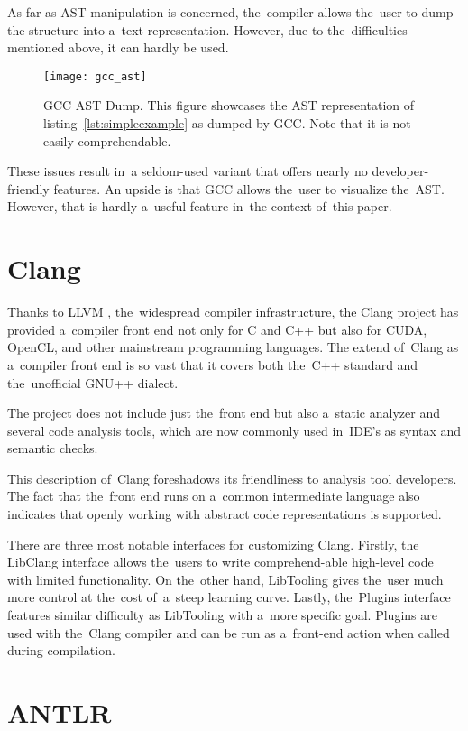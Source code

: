 As far as AST manipulation is concerned, the~compiler allows the~user to dump 
the structure into a~text representation. 
However, due to the~difficulties mentioned above, it can hardly be used.

\begin{figure}[p]\centering
\texttt{[image: gcc\_ast]}
\caption{GCC AST Dump. This figure showcases 
the AST representation of listing~\ref{lst:simpleexample}
as dumped by GCC. Note that it is not easily comprehendable.}
\label{img:gcc}
\end{figure}

These issues result in~a seldom-used variant that offers nearly 
no developer-friendly features. 
An upside is that GCC allows the~user to visualize the~AST. 
However, that is hardly a~useful feature in~the context of~this paper.

\section{Clang}

Thanks to LLVM \citep{llvm:online}, the~widespread compiler infrastructure,
the Clang project \citep{clang:online}
has provided a~compiler front end not only for C and C++ but also 
for CUDA, OpenCL, and other mainstream programming languages. 
The extend of~Clang as a~compiler front end is so vast that it covers 
both the~C++ standard and the~unofficial GNU++ dialect.

The project does not include just the~front end but also a~static analyzer 
and several code analysis tools, which are now commonly used in~IDE's as 
syntax and semantic checks. 

This description of~Clang foreshadows its friendliness to analysis tool developers. 
The fact that the~front end runs on a~common intermediate language also indicates 
that openly working with abstract code representations is supported.

There are three most notable interfaces for customizing Clang. 
Firstly, the LibClang interface allows the~users to write 
comprehend-able high-level code with limited functionality. 
On the~other hand, LibTooling gives the~user much more control 
at the~cost of~a~steep learning curve. 
Lastly, the~Plugins interface features similar difficulty 
as LibTooling with a~more specific goal. 
Plugins are used with the~Clang compiler and can be run 
as a~front-end action when called during compilation.

\section{ANTLR}

